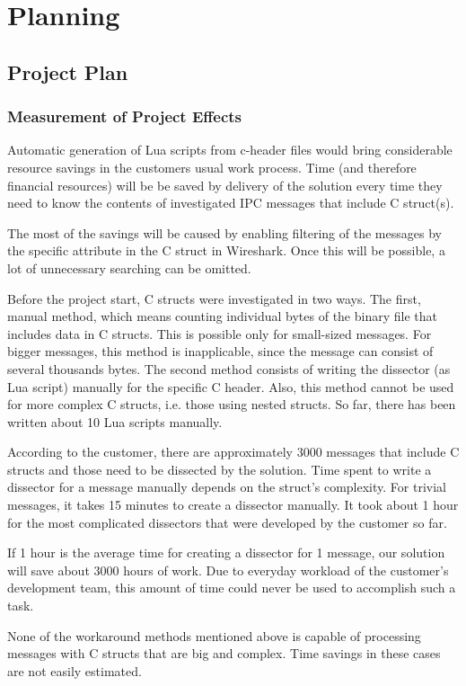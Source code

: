 \chapter{Planning}
\section{Project Plan}


\subsection{Measurement of Project Effects}
Automatic generation of Lua scripts from c-header files would bring considerable resource savings in the customers usual work process. Time (and therefore financial resources) will be  be saved by delivery of the solution every time they need to know the contents of investigated IPC messages that include C struct(s).

The most of the savings will be caused by enabling filtering of the messages by the specific attribute in the C struct in Wireshark. Once this will be possible, a lot of unnecessary searching can be omitted.

Before the project start, C structs were investigated in two ways. The first, manual method, which means counting individual bytes of the binary file that includes data in C structs. This is possible only for small-sized messages. For bigger messages, this method is inapplicable, since the message can consist of several thousands bytes. The second method consists of writing the dissector (as Lua script) manually for the specific C header. Also, this method cannot be used for more complex C structs, i.e. those using nested structs. So far, there has been written about 10 Lua scripts manually.

According to the customer, there are approximately 3000 messages that include C structs and those need to be dissected by the solution. Time spent to write a dissector for a message manually depends on the struct’s complexity. For trivial messages, it takes 15 minutes to create a dissector manually. It took about 1 hour for the most complicated dissectors that were developed by the customer so far.

If 1 hour is the average time for creating a dissector for 1 message, our solution will save about 3000 hours of work. Due to everyday workload of the customer’s development team, this amount of time could never be used to accomplish such a task.

None of the workaround methods mentioned above is capable of processing messages with C structs that are big and complex. Time savings in these cases are not easily estimated.

